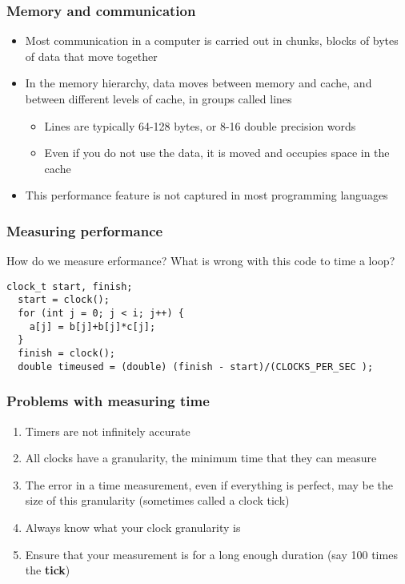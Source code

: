 \documentclass{beamer}
\begin{document}
\begin{frame}
\frametitle{Memory and communication}

\begin{itemize}
\item Most communication in a computer is carried out in chunks, blocks of bytes of data that move together

\item In the memory hierarchy, data moves between memory and cache, and between different levels of cache, in groups called lines
\begin{itemize}

 \item Lines are typically 64-128 bytes, or 8-16 double precision words

 \item Even if you do not use the data, it is moved and occupies space in the cache

\end{itemize}

\noindent
\item This performance feature is not captured in most programming languages
\end{itemize}

\noindent
\end{frame}

\begin{frame}
\frametitle{Measuring performance}

How do we measure erformance? What is wrong with this code to time a loop?
\begin{Verbatim}[numbers=none,fontsize=\fontsize{9pt}{9pt},baselinestretch=0.95]
  clock_t start, finish;
  start = clock();
  for (int j = 0; j < i; j++) {
    a[j] = b[j]+b[j]*c[j];
  }
  finish = clock();
  double timeused = (double) (finish - start)/(CLOCKS_PER_SEC );
\end{Verbatim}
\end{frame}

\begin{frame}
\frametitle{Problems with measuring time}

\begin{enumerate}
\item Timers are not infinitely accurate

\item All clocks have a granularity, the minimum time that they can measure

\item The error in a time measurement, even if everything is perfect, may be the size of this granularity (sometimes called a clock tick)

\item Always know what your clock granularity is

\item Ensure that your measurement is for a long enough duration (say 100 times the \textbf{tick})
\end{enumerate}

\noindent
\end{frame}
\end{document}
